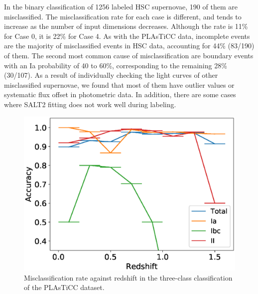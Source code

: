\documentclass[useamsfonts]{pasj01}
\begin{document}
In the binary classification of 1256 labeled HSC supernovae, 190 of them are misclassified.
The misclassification rate for each case is different, and tends to increase as the number of input dimensions decreases.
Although the rate is 11\% for Case 0, it is 22\% for Case 4.
As with the PLAsTiCC data, incomplete events are the majority of misclassified events in HSC data, accounting for 44\% (83/190) of them.
The second most common cause of misclassification are boundary events with an Ia probability of 40 to 60\%, corresponding to the remaining 28\% (30/107).
As a result of individually checking the light curves of other misclassified supernovae, we found that most of them have outlier values or systematic flux offset in photometric data.
In addition, there are some cases where SALT2 fitting does not work well during labeling.
%
\begin{figure}[ht]
  \begin{center}
     \includegraphics[width=\columnwidth]{figures/misclass_rate_plastic_3class.eps}
  \end{center}
  \caption{%
  Misclassification rate against redshift in the three-class classification of the PLAsTiCC dataset.
  }%
  \label{fig:misclass_rate_3class}
\end{figure}
%
%
\end{document}
